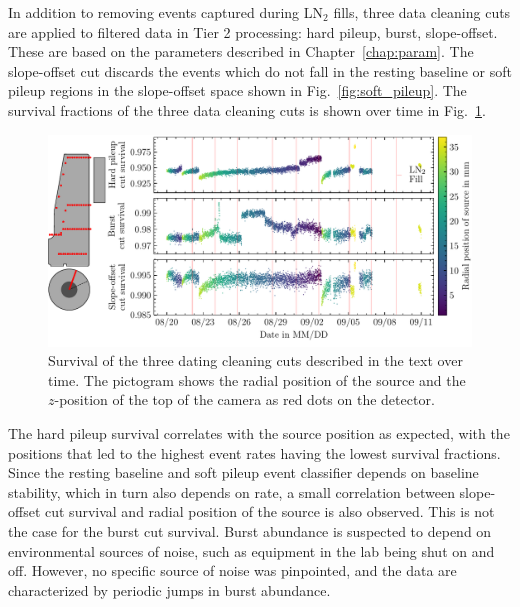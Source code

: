 In addition to removing events captured during LN$_2$ fills, three data cleaning cuts are applied to filtered data in Tier 2 processing: hard pileup, burst, slope-offset. These are based on the parameters described in Chapter~\ref{chap:param}. The slope-offset cut discards the events which do not fall in the resting baseline or soft pileup regions in the slope-offset space shown in Fig.~\ref{fig:soft_pileup}. The survival fractions of the three data cleaning cuts is shown over time in Fig.~\ref{fig:cleaningcut_stability}.
\begin{figure}[htb]
    \centering
    \includegraphics[width=6in]{figs/pipeline/cleaningcut_stability.pdf}
    \caption{Survival of the three dating cleaning cuts described in the text over time. The pictogram shows the radial position of the \CsS{} source and the $z$-position of the top of the camera as red dots on the detector.}
    \label{fig:cleaningcut_stability}
\end{figure}

The hard pileup survival correlates with the \CsS{} source position as expected, with the positions that led to the highest event rates having the lowest survival fractions. Since the resting baseline and soft pileup event classifier depends on baseline stability, which in turn also depends on rate, a small correlation between slope-offset cut survival and radial position of the source is also observed. This is not the case for the burst cut survival. Burst abundance is suspected to depend on environmental sources of noise, such as equipment in the lab being shut on and off. However, no specific source of noise was pinpointed, and the data are characterized by periodic jumps in burst abundance. 


